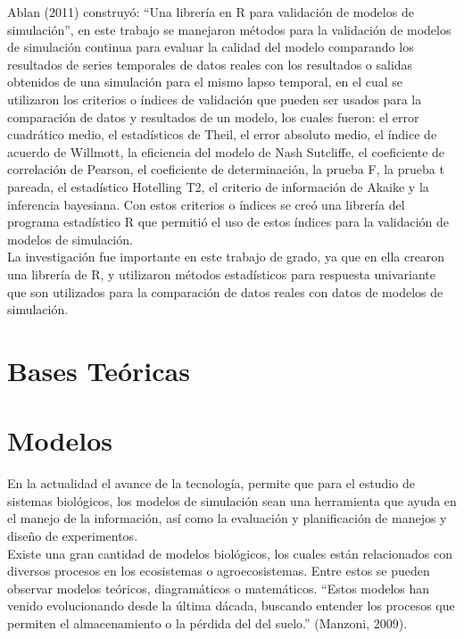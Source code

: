 Ablan (2011) construy\'o: “Una librer\'ia en R para validaci\'on de modelos de simulaci\'on”, en este trabajo se manejaron m\'etodos para la validaci\'on de modelos de simulaci\'on continua para evaluar la calidad del modelo comparando los resultados de series temporales de datos reales con los resultados o salidas obtenidos de una simulaci\'on para el mismo lapso temporal, en el cual se utilizaron los criterios o \'indices de validaci\'on que pueden ser usados para la comparaci\'on de datos y resultados de un modelo, los cuales fueron: el error cuadr\'atico medio, el estad\'isticos de Theil, el error absoluto medio, el \'indice de acuerdo de Willmott, la eficiencia del modelo de Nash Sutcliffe, el coeficiente de correlaci\'on de Pearson, el coeficiente de determinaci\'on, la prueba F, la prueba t pareada, el estad\'istico Hotelling T2, el criterio de informaci\'on de Akaike y la inferencia bayesiana. Con estos criterios o \'indices se cre\'o una librer\'ia del programa estad\'istico R que permiti\'o el uso de estos \'indices para la validaci\'on de modelos de simulaci\'on.\\

La investigaci\'on fue importante en este trabajo de grado, ya que en ella crearon una librer\'ia de R, y utilizaron m\'etodos estad\'isticos para respuesta univariante que son utilizados para la comparaci\'on de datos reales con datos de modelos de simulaci\'on.\\

\section{Bases Te\'oricas}

\section{Modelos}

En la actualidad el avance de la tecnolog\'ia, permite que para el estudio de sistemas biol\'ogicos,  los modelos de simulaci\'on sean una herramienta que ayuda en el manejo de la informaci\'on, as\'i como la evaluaci\'on y planificaci\'on de manejos y dise\~no de experimentos.\\

Existe una gran cantidad de modelos biol\'ogicos, los cuales est\'an relacionados con diversos procesos en los ecosistemas o agroecosistemas. Entre estos se pueden observar modelos te\'oricos, diagram\'aticos o matem\'aticos. “Estos modelos han venido evolucionando desde la \'ultima d\'acada, buscando entender los procesos que permiten el almacenamiento o la p\'erdida del del suelo.” (Manzoni, 2009).\\

